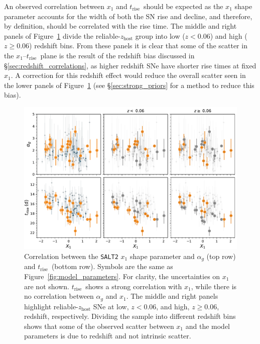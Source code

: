 \documentclass[twocolumn]{./aastex63}
\newcommand{\trise}{$t_\mathrm{rise}$}
\begin{document}
An observed correlation between $x_1$ and \trise\ should be expected as the
$x_1$ shape parameter accounts for the width of both the SN rise and decline,
and therefore, by definition, should be correlated with the rise time. The
middle and right panels of Figure~\ref{fig:shape_correlations} divide the
reliable-$z_\mathrm{host}$ group into low ($z < 0.06$) and high ($z \ge 0.06$)
redshift bins. From these panels it is clear that some of the scatter in the
$x_1$--\trise\ plane is the result of the redshift bias discussed in
\S\ref{sec:redshift_correlations}, as higher redshift SNe have shorter rise
times at fixed $x_1$. A correction for this redshift effect would reduce the
overall scatter seen in the lower panels of
Figure~\ref{fig:shape_correlations} (see \S\ref{sec:strong_priors} for a
method to reduce this bias).

\begin{figure}
    \centering
    \includegraphics[width=6in]{./figures/shape_correlations.pdf}
    \caption{Correlation between the \texttt{SALT2} $x_1$ shape parameter and
    $\alpha_g$ (top row) and \trise\ (bottom row). Symbols are the same as
    Figure~\ref{fig:model_parameters}. For clarity, the uncertainties on $x_1$
    are not shown. \trise\ shows a strong correlation with $x_1$, while there
    is no correlation between $\alpha_g$ and $x_1$. The middle and right
    panels highlight reliable-$z_\mathrm{host}$ SNe at low, $z < 0.06$, and
    high, $z \ge 0.06$, redshift, respectively. Dividing the sample into
    different redshift bins shows that some of the observed scatter between
    $x_1$ and the model parameters is due to redshift and not intrinsic
    scatter. }
    \label{fig:shape_correlations}
\end{figure}
\end{document}
